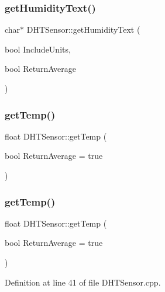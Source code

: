 \subsubsection{\texorpdfstring{get\+Humidity\+Text()}{getHumidityText()}\hspace{0.1cm}{\footnotesize\ttfamily [2/2]}}
{\footnotesize\ttfamily char$\ast$ D\+H\+T\+Sensor\+::get\+Humidity\+Text (\begin{DoxyParamCaption}\item[{bool}]{Include\+Units,  }\item[{bool}]{Return\+Average }\end{DoxyParamCaption})}

\mbox{\label{class_d_h_t_sensor_acd945543fd907dfd5dd6c1dcd4612af1}} 
\subsubsection{\texorpdfstring{get\+Temp()}{getTemp()}\hspace{0.1cm}{\footnotesize\ttfamily [1/2]}}
{\footnotesize\ttfamily float D\+H\+T\+Sensor\+::get\+Temp (\begin{DoxyParamCaption}\item[{bool}]{Return\+Average = {\ttfamily true} }\end{DoxyParamCaption})}

\mbox{\label{class_d_h_t_sensor_acd945543fd907dfd5dd6c1dcd4612af1}} 
\subsubsection{\texorpdfstring{get\+Temp()}{getTemp()}\hspace{0.1cm}{\footnotesize\ttfamily [2/2]}}
{\footnotesize\ttfamily float D\+H\+T\+Sensor\+::get\+Temp (\begin{DoxyParamCaption}\item[{bool}]{Return\+Average = {\ttfamily true} }\end{DoxyParamCaption})}



Definition at line 41 of file D\+H\+T\+Sensor.\+cpp.

